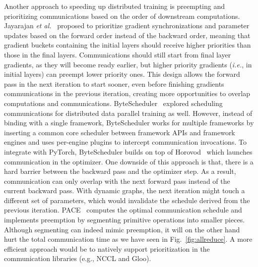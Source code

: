Another approach to speeding up distributed training is preempting and prioritizing communications based on the order of downstream computations. Jayarajan \emph{et al.}~\cite{sosp:19:priority} proposed to prioritize gradient synchronizations and parameter updates based on the forward order instead of the backward order, meaning that gradient buckets containing the initial layers should receive higher priorities than those in the final layers. Communications should still start from final layer gradients, as they will become ready earlier, but higher priority gradients (\emph{i.e.}, in initial layers) can preempt lower priority ones. This design allows the forward pass in the next iteration to start sooner, even before finishing gradients communications in the previous iteration, creating more opportunities to overlap computations and communications. ByteScheduler~\cite{bytescheduler} explored scheduling communications for distributed data parallel training as well. However, instead of binding with a single framework, ByteScheduler works for multiple frameworks by inserting a common core scheduler between framework APIs and framework engines and uses per-engine plugins to intercept communication invocations. To integrate with PyTorch, ByteScheduler builds on top of Horovod~\cite{sergeev2018horovod} which launches communication in the optimizer. One downside of this approach is that, there is a hard barrier between the backward pass and the optimizer step. As a result, communication can only overlap with the next forward pass instead of the current backward pass. With dynamic graphs, the next iteration might touch a different set of parameters, which would invalidate the schedule derived from the previous iteration. PACE~\cite{baopreemptive} computes the optimal communication schedule and implements preemption by segmenting primitive  operations into smaller pieces. Although segmenting can indeed mimic preemption, it will on the other hand hurt the total communication time as we have seen in Fig.~\ref{fig:allreduce}. A more efficient approach would be to natively support prioritization in the communication libraries (e.g., NCCL and Gloo).

